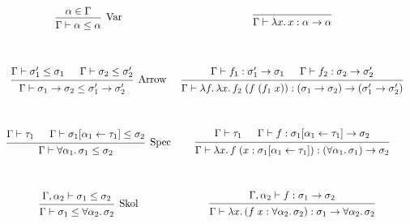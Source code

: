 \documentclass[12pt]{article}
\begin{document}
\pagestyle{empty}

\begin{align*}
    \def\arraystretch{5}
    \begin{array}{cc}
        \begin{prooftree}
            \hypo{\alpha \in \Gamma}
            \infer1[Var]{\Gamma \vdash \alpha \leq \alpha}
        \end{prooftree}
        &
        \begin{prooftree}
            \infer0{\Gamma \vdash \lambda x\ldotp x: \alpha \to \alpha}
        \end{prooftree}
        \\
        \begin{prooftree}
            \hypo{\Gamma \vdash \sigma'_1 \leq \sigma_1}
            \hypo{\Gamma \vdash \sigma_2 \leq \sigma'_2}
            \infer2[Arrow]{\Gamma \vdash \sigma_1 \to \sigma_2 \leq \sigma'_1 \to \sigma'_2}
        \end{prooftree}
        &
        \begin{prooftree}
            \hypo{\Gamma \vdash f_1: \sigma'_1 \to \sigma_1}
            \hypo{\Gamma \vdash f_2: \sigma_2 \to \sigma'_2}
            \infer2{\Gamma \vdash \lambda f\ldotp \lambda x\ldotp f_2\; (f\; (f_1\; x)): (\sigma_1 \to \sigma_2) \to (\sigma'_1 \to \sigma'_2)}
        \end{prooftree}
        \\
        \begin{prooftree}
            \hypo{\Gamma \vdash \tau_1}
            \hypo{\Gamma \vdash \sigma_1[\alpha_1 \leftarrow \tau_1] \leq \sigma_2}
            \infer2[Spec]{\Gamma \vdash \forall \alpha_1\ldotp \sigma_1 \leq \sigma_2}
        \end{prooftree}
        &
        \begin{prooftree}
            \hypo{\Gamma \vdash \tau_1}
            \hypo{\Gamma \vdash f: \sigma_1[\alpha_1 \leftarrow \tau_1] \to \sigma_2}
            \infer2{\Gamma \vdash \lambda x\ldotp f\; (x: \sigma_1[\alpha_1 \leftarrow \tau_1]): (\forall \alpha_1\ldotp \sigma_1) \to \sigma_2}
        \end{prooftree}
        \\
        \begin{prooftree}
            \hypo{\Gamma, \alpha_2 \vdash \sigma_1 \leq \sigma_2}
            \infer1[Skol]{\Gamma \vdash \sigma_1 \leq \forall \alpha_2\ldotp \sigma_2}
        \end{prooftree}
        &
        \begin{prooftree}
            \hypo{\Gamma, \alpha_2 \vdash f: \sigma_1 \to \sigma_2}
            \infer1{\Gamma \vdash \lambda x\ldotp (f\; x: \forall \alpha_2\ldotp \sigma_2): \sigma_1 \to \forall \alpha_2\ldotp \sigma_2}
        \end{prooftree}
    \end{array}
\end{align*}
\end{document}
